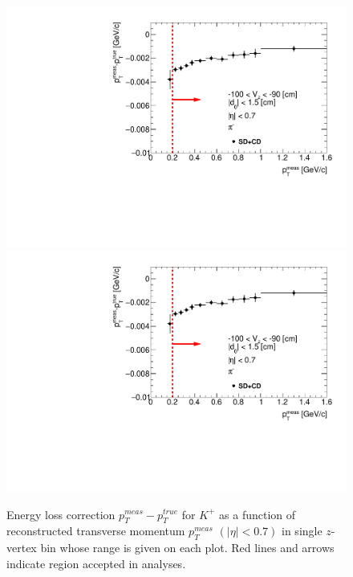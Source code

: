 \begin{figure}[H]
\caption[Energy loss correction for $K^+$ as a function of reconstructed transverse momentum $p_T^{meas}$.]{Energy loss correction $p_T^{meas}-p_T^{true}$ for $K^+$ as a function of reconstructed transverse momentum $p_T^{meas}$ $\left(|\eta|<0.7\right)$ in single $z$-vertex bin whose range is given on each plot. Red lines and arrows indicate region accepted in analyses.}\label{fig:energyLossPrimaryK_plus}
\parbox{0.329\textwidth}{
  \includegraphics[width=\linewidth,page=83]{graphics/energyLoss/energyLoss3D_OnePrtAlso.pdf}\\
  \includegraphics[width=\linewidth,page=86]{graphics/energyLoss/energyLoss3D_OnePrtAlso.pdf}\\
}
\end{figure}
